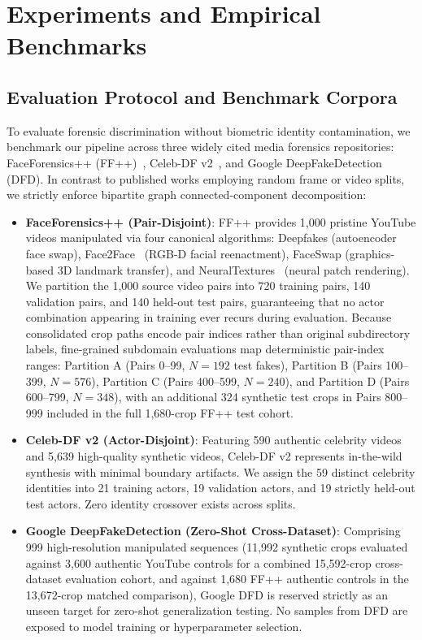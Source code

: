 \documentclass[10pt,twocolumn,letterpaper]{article}
\begin{document}
\section{Experiments and Empirical \mbox{Benchmarks}}
\label{sec:experiments}

\subsection{Evaluation Protocol and Benchmark \mbox{Corpora}}
\label{sec:exp_protocol}

To evaluate forensic discrimination without biometric identity contamination, we benchmark our pipeline across three widely cited media forensics repositories: FaceForensics++ (FF++)~\cite{roessler2019faceforensicspp}, Celeb-DF v2~\cite{li2020celebdf}, and Google DeepFakeDetection (DFD). In contrast to published works employing random frame or video splits, we strictly enforce bipartite graph connected-component decomposition:
\begin{itemize}
\item \textbf{FaceForensics++ (Pair-Disjoint)}: FF++ provides 1,000 pristine YouTube videos manipulated via four canonical algorithms: Deepfakes (autoencoder face swap), Face2Face~\cite{thies2016face2face} (RGB-D facial reenactment), FaceSwap (graphics-based 3D landmark transfer), and NeuralTextures~\cite{thies2019neural} (neural patch rendering). We partition the 1,000 source video pairs into 720 training pairs, 140 validation pairs, and 140 held-out test pairs, guaranteeing that no actor combination appearing in training ever recurs during evaluation. Because consolidated crop paths encode pair indices rather than original subdirectory labels, fine-grained subdomain evaluations map deterministic pair-index ranges: Partition A (Pairs 0--99, $N=192$ test fakes), Partition B (Pairs 100--399, $N=576$), Partition C (Pairs 400--599, $N=240$), and Partition D (Pairs 600--799, $N=348$), with an additional 324 synthetic test crops in Pairs 800--999 included in the full 1,680-crop FF++ test cohort.
\item \textbf{Celeb-DF v2 (Actor-Disjoint)}: Featuring 590 authentic celebrity videos and 5,639 high-quality synthetic videos, Celeb-DF v2 represents in-the-wild synthesis with minimal boundary artifacts. We assign the 59 distinct celebrity identities into 21 training actors, 19 validation actors, and 19 strictly held-out test actors. Zero identity crossover exists across splits.
\item \textbf{Google DeepFakeDetection (Zero-Shot Cross-Dataset)}: Comprising 999 high-resolution manipulated sequences (11,992 synthetic crops evaluated against 3,600 authentic YouTube controls for a combined 15,592-crop cross-dataset evaluation cohort, and against 1,680 FF++ authentic controls in the 13,672-crop matched comparison), Google DFD is reserved strictly as an unseen target for zero-shot generalization testing. No samples from DFD are exposed to model training or hyperparameter selection.
\end{itemize}
\end{document}

